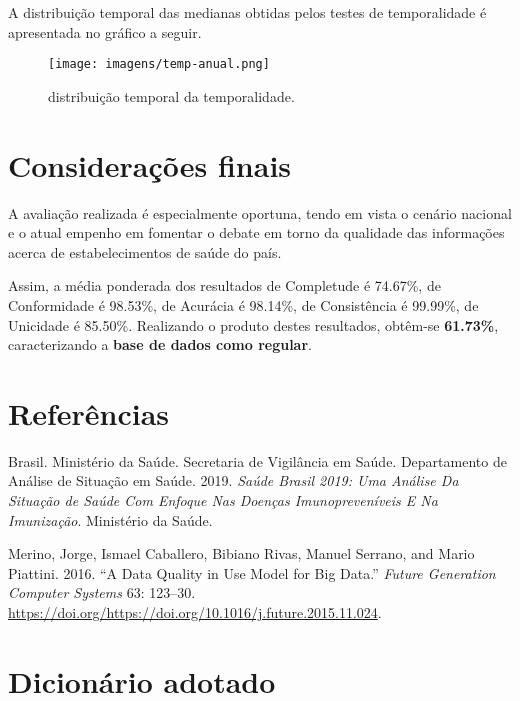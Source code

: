 \documentclass[
  12,
  table]{proadi}
\begin{document}
A distribuição temporal das medianas obtidas pelos testes de
temporalidade é apresentada no gráfico a seguir.

\begin{figure}
\centering
\texttt{[image: imagens/temp-anual.png]}
\caption{distribuição temporal da temporalidade.}
\end{figure}

\hypertarget{considerauxe7uxf5es-finais}{%
\section{Considerações finais}\label{considerauxe7uxf5es-finais}}

A avaliação realizada é especialmente oportuna, tendo em vista o cenário
nacional e o atual empenho em fomentar o debate em torno da qualidade
das informações acerca de estabelecimentos de saúde do país.

Assim, a média ponderada dos resultados de Completude é 74.67\%, de
Conformidade é 98.53\%, de Acurácia é 98.14\%, de Consistência é
99.99\%, de Unicidade é 85.50\%. Realizando o produto destes resultados,
obtêm-se \textbf{61.73\%}, caracterizando a \textbf{base de dados como
regular}.

\newpage

\hypertarget{referuxeancias}{%
\section{Referências}\label{referuxeancias}}

\hypertarget{refs}{}
\leavevmode\hypertarget{ref-brasil2019}{}%
Brasil. Ministério da Saúde. Secretaria de Vigilância em Saúde.
Departamento de Análise de Situação em Saúde. 2019. \emph{Saúde Brasil
2019: Uma Análise Da Situação de Saúde Com Enfoque Nas Doenças
Imunopreveníveis E Na Imunização}. Ministério da Saúde.

\leavevmode\hypertarget{ref-merino}{}%
Merino, Jorge, Ismael Caballero, Bibiano Rivas, Manuel Serrano, and
Mario Piattini. 2016. ``A Data Quality in Use Model for Big Data.''
\emph{Future Generation Computer Systems} 63: 123--30.
\url{https://doi.org/https://doi.org/10.1016/j.future.2015.11.024}.

\captionsetup[table]{labelformat=empty}

\newpage

\hypertarget{dicionuxe1rio-adotado}{%
\section*{Dicionário adotado}\label{dicionuxe1rio-adotado}}
\end{document}
